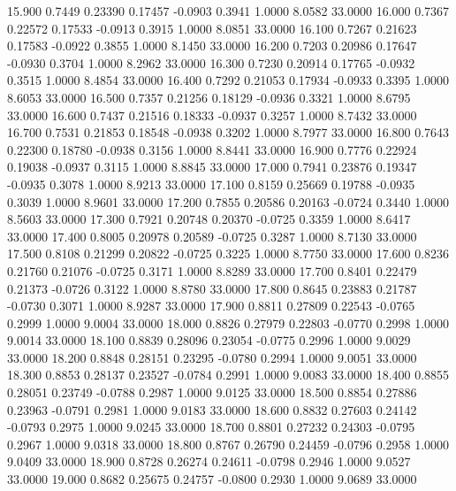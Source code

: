   15.900   0.7449   0.23390   0.17457  -0.0903   0.3941   1.0000   8.0582  33.0000
  16.000   0.7367   0.22572   0.17533  -0.0913   0.3915   1.0000   8.0851  33.0000
  16.100   0.7267   0.21623   0.17583  -0.0922   0.3855   1.0000   8.1450  33.0000
  16.200   0.7203   0.20986   0.17647  -0.0930   0.3704   1.0000   8.2962  33.0000
  16.300   0.7230   0.20914   0.17765  -0.0932   0.3515   1.0000   8.4854  33.0000
  16.400   0.7292   0.21053   0.17934  -0.0933   0.3395   1.0000   8.6053  33.0000
  16.500   0.7357   0.21256   0.18129  -0.0936   0.3321   1.0000   8.6795  33.0000
  16.600   0.7437   0.21516   0.18333  -0.0937   0.3257   1.0000   8.7432  33.0000
  16.700   0.7531   0.21853   0.18548  -0.0938   0.3202   1.0000   8.7977  33.0000
  16.800   0.7643   0.22300   0.18780  -0.0938   0.3156   1.0000   8.8441  33.0000
  16.900   0.7776   0.22924   0.19038  -0.0937   0.3115   1.0000   8.8845  33.0000
  17.000   0.7941   0.23876   0.19347  -0.0935   0.3078   1.0000   8.9213  33.0000
  17.100   0.8159   0.25669   0.19788  -0.0935   0.3039   1.0000   8.9601  33.0000
  17.200   0.7855   0.20586   0.20163  -0.0724   0.3440   1.0000   8.5603  33.0000
  17.300   0.7921   0.20748   0.20370  -0.0725   0.3359   1.0000   8.6417  33.0000
  17.400   0.8005   0.20978   0.20589  -0.0725   0.3287   1.0000   8.7130  33.0000
  17.500   0.8108   0.21299   0.20822  -0.0725   0.3225   1.0000   8.7750  33.0000
  17.600   0.8236   0.21760   0.21076  -0.0725   0.3171   1.0000   8.8289  33.0000
  17.700   0.8401   0.22479   0.21373  -0.0726   0.3122   1.0000   8.8780  33.0000
  17.800   0.8645   0.23883   0.21787  -0.0730   0.3071   1.0000   8.9287  33.0000
  17.900   0.8811   0.27809   0.22543  -0.0765   0.2999   1.0000   9.0004  33.0000
  18.000   0.8826   0.27979   0.22803  -0.0770   0.2998   1.0000   9.0014  33.0000
  18.100   0.8839   0.28096   0.23054  -0.0775   0.2996   1.0000   9.0029  33.0000
  18.200   0.8848   0.28151   0.23295  -0.0780   0.2994   1.0000   9.0051  33.0000
  18.300   0.8853   0.28137   0.23527  -0.0784   0.2991   1.0000   9.0083  33.0000
  18.400   0.8855   0.28051   0.23749  -0.0788   0.2987   1.0000   9.0125  33.0000
  18.500   0.8854   0.27886   0.23963  -0.0791   0.2981   1.0000   9.0183  33.0000
  18.600   0.8832   0.27603   0.24142  -0.0793   0.2975   1.0000   9.0245  33.0000
  18.700   0.8801   0.27232   0.24303  -0.0795   0.2967   1.0000   9.0318  33.0000
  18.800   0.8767   0.26790   0.24459  -0.0796   0.2958   1.0000   9.0409  33.0000
  18.900   0.8728   0.26274   0.24611  -0.0798   0.2946   1.0000   9.0527  33.0000
  19.000   0.8682   0.25675   0.24757  -0.0800   0.2930   1.0000   9.0689  33.0000
